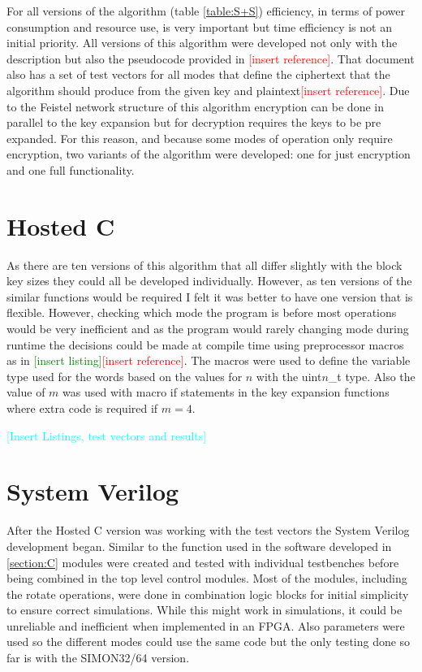 \documentclass[12pt,twoside,a4paper]{report}
\begin{document}
    For all versions of the algorithm (table \ref{table:S+S}) efficiency, in terms of power consumption and resource use, is very important but time efficiency is not an initial priority. All versions of this algorithm were developed not only with the description but also the pseudocode provided in \textcolor{red}{[insert reference]}. That document also has a set of test vectors for all modes that define the ciphertext that the algorithm should produce from the given key and plaintext\textcolor{red}{[insert reference]}. Due to the Feistel network structure of this algorithm encryption can be done in parallel to the key expansion but for decryption requires the keys to be pre expanded. For this reason, and because some modes of operation only require encryption, two variants of the algorithm were developed: one for just encryption and one full functionality.
    
    \section{Hosted C}
    \label{section:C}
    As there are ten versions of this algorithm that all differ slightly with the block key sizes they could all be developed individually. However, as ten versions of the similar functions would be required I felt it was better to have one version that is flexible. However, checking which mode the program is before most operations would be very inefficient and as the program would rarely changing mode during runtime the decisions could be made at compile time using preprocessor macros as in \textcolor{green}{[insert listing]}\textcolor{red}{[insert reference]}. The macros were used to define the variable type used for the words based on the values for $n$ with the uint$n$\_t type. Also the value of $m$ was used with macro if statements in the key expansion functions where extra code is required if $m = 4$.
    
    \textcolor{cyan}{[Insert Listings, test vectors and results]}
    
    \section{System Verilog}
    After the Hosted C version was working with the test vectors the System Verilog development began. Similar to the function used in the software developed in \autoref{section:C} modules were created and tested with individual testbenches before being combined in the top level control modules. Most of the modules, including the rotate operations, were done in combination logic blocks for initial simplicity to ensure correct simulations. While this might work in simulations, it could be unreliable and inefficient when implemented in an FPGA. Also parameters were used so the different modes could use the same code but the only testing done so far is with the SIMON32/64 version.
    
\end{document}
